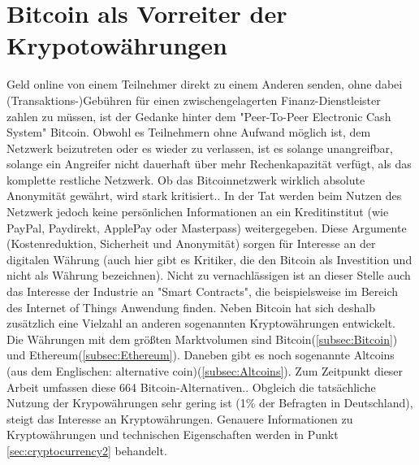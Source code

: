\section{Bitcoin als Vorreiter der Krypotowährungen}\label{sec:cryptocurrency}
Geld online von einem Teilnehmer direkt zu einem Anderen senden, ohne dabei (Transaktions-)Gebühren für einen zwischengelagerten Finanz-Dienstleister zahlen zu müssen, ist der Gedanke hinter dem "Peer-To-Peer Electronic Cash System"\citep{nakamoto_bitcoin:_2008} Bitcoin. Obwohl es Teilnehmern ohne Aufwand möglich ist, dem Netzwerk beizutreten oder es wieder zu verlassen, ist es solange unangreifbar, solange ein Angreifer nicht dauerhaft über mehr Rechenkapazität verfügt, als das komplette restliche Netzwerk.\citep{nakamoto_bitcoin:_2008} Ob das Bitcoinnetzwerk wirklich absolute Anonymität gewährt, wird stark kritisiert.\citep{reid_analysis_2013,androulaki_evaluating_2013}. In der Tat werden beim Nutzen des Netzwerk jedoch keine persönlichen Informationen an ein Kreditinstitut (wie PayPal, Paydirekt, ApplePay oder Masterpass) weitergegeben. Diese Argumente (Kostenreduktion, Sicherheit und Anonymität) sorgen für Interesse an der digitalen Währung (auch hier gibt es Kritiker, die den Bitcoin als Investition und nicht als Währung bezeichnen)\citep{baur_bitcoin:_2015}. Nicht zu vernachlässigen ist an dieser Stelle auch das Interesse der Industrie an "Smart Contracts"\citep[S.~10]{dannen_introducing_2017}, die beispielsweise im Bereich des Internet of Things Anwendung finden.\citep{christidis_blockchains_2016}\newline
Neben Bitcoin hat sich deshalb zusätzlich eine Vielzahl an anderen sogenannten Kryptowährungen entwickelt. Die Währungen mit dem größten Marktvolumen sind  Bitcoin(\ref{subsec:Bitcoin}) und Ethereum(\ref{subsec:Ethereum})\citep{wood_ethereum:_2014}.\citep{brandt_infografik:_2017, coinmarketcap_ranking_2017} Daneben gibt es noch sogenannte Altcoins (aus dem Englischen: alternative coin\citep{prableen_bajpai_altcoin_2014})(\ref{subsec:Altcoins}). Zum Zeitpunkt dieser Arbeit umfassen diese 664 Bitcoin-Alternativen.\citep{coindesk_anzahl_2017}. Obgleich die tatsächliche Nutzung der Krypowährungen sehr gering ist (1\% der Befragten in Deutschland\citep{tsys_kennen_2016}), steigt das Interesse an Kryptowährungen\citep{wikitrends_compare_2017,googletrends_googletrends_2017}.\newline
Genauere Informationen zu Kryptowährungen und technischen Eigenschaften werden in Punkt \ref{sec:cryptocurrency2} behandelt.

